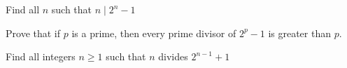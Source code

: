 \documentclass{article}
\theoremstyle{mytheoremstyle}
\theoremstyle{mytheoremstyle}
\theoremstyle{myproblemstyle}
\begin{document}
    \begin{problem}
        Find all $n$ such that $n \mid 2^n - 1$
    \end{problem}

    \begin{problem}
        Prove that if $p$ is a prime, then every prime divisor of $2^p - 1$ is greater than $p$.
    \end{problem}

    \begin{problem}
        Find all integers $n \geq 1$ such that $n$ divides $2^{n-1} + 1$
    \end{problem}



    
    
\end{document}
